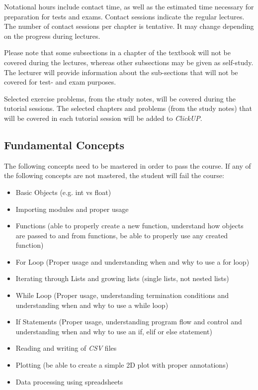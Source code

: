         Notational hours include contact time, as well as the estimated time
        necessary for preparation for tests and exams. Contact sessions
        indicate the regular lectures. The number of contact sessions per
        chapter is tentative. It may change depending on the progress during
        lectures.

        Please note that some subsections in a chapter of the textbook will not
        be covered during the lectures, whereas other subsections may be given
        as self-study. The lecturer will provide information about the
        sub-sections that will not be covered for test- and exam purposes.

        Selected exercise problems, from the study notes, will be covered
        during the tutorial sessions. The selected chapters and problems (from
        the study notes) that will be covered in each tutorial session will be
        added to {\it ClickUP}.

    \subsection{Fundamental Concepts}
        The following concepts need to be mastered in order to pass the course.
        If any of the following concepts are not mastered, the student will
        fail the course:
        \begin{itemize}
            \item Basic Objects (e.g. int vs float)
            \item Importing modules and proper usage
            \item Functions (able to properly create a new function, understand
                how objects are passed to and from functions, be able to
                properly use any created function)
            \item For Loop (Proper usage and understanding when and why to use
                a for loop)
            \item Iterating through Lists and growing lists (single lists, not
                nested lists)
            \item While Loop (Proper usage, understanding termination
                conditions and understanding when and why to use a while loop)
            \item If Statements (Proper usage, understanding program flow and
                control and understanding when and why to use an if, elif or
                else statement)
            \item Reading and writing of {\it CSV} files
            \item Plotting (be able to create a simple 2D plot with proper
                annotations)
            \item Data processing using spreadsheets
        \end{itemize}

